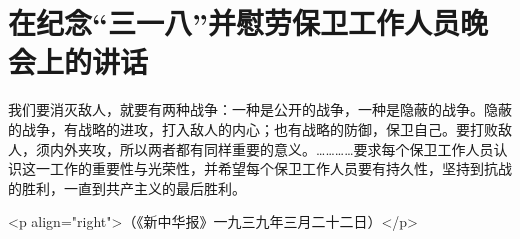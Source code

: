 \section[在纪念“三一八”并慰劳保卫工作人员晚会上的讲话（一九三九年三月十八日）]{在纪念“三一八”并慰劳保卫工作人员晚会上的讲话}


我们要消灭敌人，就要有两种战争：一种是公开的战争，一种是隐蔽的战争。隐蔽的战争，有战略的进攻，打入敌人的内心；也有战略的防御，保卫自己。要打败敌人，须内外夹攻，所以两者都有同样重要的意义。…………要求每个保卫工作人员认识这一工作的重要性与光荣性，并希望每个保卫工作人员要有持久性，坚持到抗战的胜利，一直到共产主义的最后胜利。

<p align="right">（《新中华报》一九三九年三月二十二日）</p>

